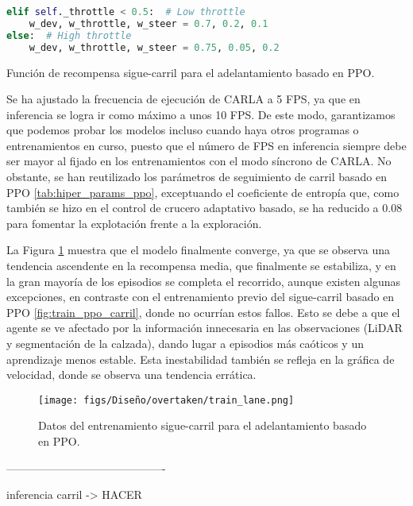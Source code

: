 \begin{code}[h]
\begin{lstlisting}[language=Python]
elif self._throttle < 0.5:  # Low throttle
    w_dev, w_throttle, w_steer = 0.7, 0.2, 0.1
else:  # High throttle
    w_dev, w_throttle, w_steer = 0.75, 0.05, 0.2
\end{lstlisting}
\caption[Función de recompensa sigue-carril para el adelantamiento basado en \ac{PPO}]{Función de recompensa sigue-carril para el adelantamiento basado en \ac{PPO}.}
\label{cod:rew_ppo_lane_overtaken}
\end{code}

Se ha ajustado la frecuencia de ejecución de CARLA a 5 \ac{FPS}, ya que en inferencia se logra ir como máximo a unos 10 \ac{FPS}. De este modo, garantizamos que podemos probar los modelos incluso cuando haya otros programas o entrenamientos en curso, puesto que el número de \ac{FPS} en inferencia siempre debe ser mayor al fijado en los entrenamientos con el modo síncrono de CARLA. No obstante, se han reutilizado los parámetros de seguimiento de carril basado en \ac{PPO} \ref{tab:hiper_params_ppo}, exceptuando el coeficiente de entropía que, como también se hizo en el control de crucero adaptativo basado, se ha reducido a 0.08 para fomentar la explotación frente a la exploración.

La Figura \ref{fig:train_lane_overtaken} muestra que el modelo finalmente converge, ya que 
se observa una tendencia ascendente en la recompensa media, que finalmente se estabiliza, y
en la gran mayoría de los episodios se completa el recorrido, aunque existen algunas excepciones, en contraste con el entrenamiento previo del sigue-carril basado en \ac{PPO} \ref{fig:train_ppo_carril}, donde no ocurrían estos fallos. Esto se debe a que el agente se ve afectado por la información innecesaria en las observaciones (\ac{LiDAR} y segmentación de la calzada), dando lugar a episodios más caóticos y un aprendizaje menos estable. Esta inestabilidad también se refleja en la gráfica de velocidad, donde se observa una tendencia errática.

\begin{figure}[ht]
\centering
\texttt{[image: figs/Diseño/overtaken/train\_lane.png]}
\caption{Datos del entrenamiento sigue-carril para el adelantamiento basado en \ac{PPO}.}
\label{fig:train_lane_overtaken}
\end{figure}

-------------------------------------------

inferencia carril -> HACER

